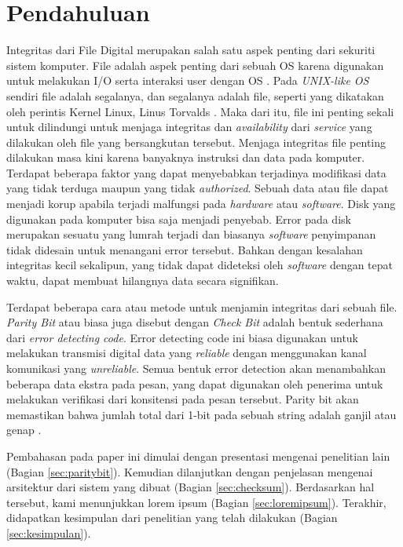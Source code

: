 \section{Pendahuluan}
\label{sec:pendahuluan}


Integritas dari File Digital merupakan salah satu aspek penting dari sekuriti sistem komputer. File adalah aspek penting dari sebuah OS karena digunakan untuk melakukan I/O serta interaksi user dengan OS \citep{stallings2008}. Pada \emph{UNIX-like OS} sendiri file adalah segalanya, dan segalanya adalah file, seperti yang dikatakan oleh perintis Kernel Linux, Linus Torvalds \cite{everythingisafile}. Maka dari itu, file ini penting sekali untuk dilindungi untuk menjaga integritas dan \emph{availability} dari \emph{service} yang dilakukan oleh file yang bersangkutan tersebut. Menjaga integritas file penting dilakukan masa kini karena banyaknya instruksi dan data pada komputer. Terdapat beberapa faktor yang dapat menyebabkan terjadinya modifikasi data yang tidak terduga maupun yang tidak \emph{authorized}. Sebuah data atau file dapat menjadi korup apabila terjadi malfungsi pada \emph{hardware} atau \emph{software}. Disk yang digunakan pada komputer bisa saja menjadi penyebab. Error pada disk merupakan sesuatu yang lumrah terjadi \citep{prabhakaran2005} dan biasanya \emph{software} penyimpanan tidak didesain untuk menangani error tersebut. Bahkan dengan kesalahan integritas kecil sekalipun, yang tidak dapat dideteksi oleh \emph{software} dengan tepat waktu, dapat membuat hilangnya data secara signifikan. 

Terdapat beberapa cara atau metode untuk menjamin integritas dari sebuah file. \emph{Parity Bit} atau biasa juga disebut dengan \emph{Check Bit} adalah bentuk sederhana dari \emph{error detecting code}. Error detecting code ini biasa digunakan untuk melakukan transmisi digital data yang \emph{reliable} dengan menggunakan kanal komunikasi yang \emph{unreliable}. Semua bentuk error detection akan menambahkan beberapa data ekstra pada pesan, yang dapat digunakan oleh penerima untuk melakukan verifikasi dari konsitensi pada pesan tersebut. Parity bit akan memastikan bahwa jumlah total dari 1-bit pada sebuah string adalah ganjil atau genap \citep{rodger2015}.

Pembahasan pada paper ini dimulai dengan presentasi mengenai penelitian lain (Bagian \ref{sec:paritybit}).
Kemudian dilanjutkan dengan penjelasan mengenai arsitektur dari sistem yang dibuat (Bagian \ref{sec:checksum}).
Berdasarkan hal tersebut, kami menunjukkan lorem ipsum (Bagian \ref{sec:loremipsum}).
Terakhir, didapatkan kesimpulan dari penelitian yang telah dilakukan (Bagian \ref{sec:kesimpulan}).
